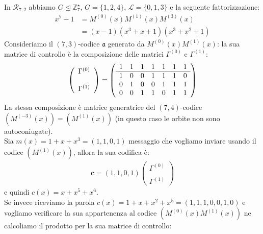 \begin{esempio} \label{ese:gamma72}
   In $\mathcal{R}_{7,2}$ abbiamo $G \trianglelefteq \mathbb{Z}_{7}^{\star}$, $G = \lbrace 1,2,4 \rbrace$, $\mathscr{L} = \lbrace 0,1,3 \rbrace$ e la seguente fattorizzazione:
   \begin{align*}
      x^{7} - 1 &= M^{(0)}(x) M^{(1)}(x) M^{(3)}(x) \\
		&= (x-1)(x^3 + x + 1)(x^3 + x^2 + 1)
  \end{align*}
  Consideriamo il $(7,3)$-codice $\mathfrak{a}$ generato da $M^{(0)}(x)M^{(1)}(x)$: la sua matrice di controllo è la composizione delle matrici $\Gamma^{(0)}$ e $\Gamma^{(1)}$:
  \begin{align*}
    \left(
    \begin{array} { c }
    \Gamma^{(0)}  \\ \\
    \Gamma^{(1)}
    \end{array}
    \right)
    =
    \left(
    \begin{array} { c c c c c c c c}
    1 & 1 & 1 & 1 & 1 & 1 & 1  \\
    \hline
    1 & 0 & 0 & 1 & 1 & 1 & 0  \\
    0 & 1 & 0 & 0 & 1 & 1 & 1  \\
    0 & 0 & 1 & 1 & 0 & 1 & 1  \\
    \end{array}
    \right)
  \end{align*}
  La stessa composizione è matrice generatrice del $(7,4)$-codice $(M^{(-3)}(x)) = (M^{(1)}(x))$ (in questo caso le orbite non sono autoconiugate).\\
  Sia $m(x) = 1 + x + x^3 = (1,1,0,1)$ messaggio che vogliamo inviare usando il codice $(M^{(1)}(x))$, allora la sua codifica è:
    \begin{align*}
    \mathbf{c}
    =
    (1,1,0,1)
    \left(
    \begin{array} { c }
    \Gamma^{(0)}  \\ \\
    \Gamma^{(1)}
    \end{array}
    \right)
  \end{align*}
  e quindi $c(x) = x+ x^5 + x^6$. \\
  Se invece riceviamo la parola $c(x) = 1 + x + x^2 + x^5 = (1,1,1,0,0,1,0)$ e vogliamo verificare la sua appartenenza al codice $(M^{(0)}(x)M^{(1)}(x))$ ne calcoliamo il prodotto per la sua matrice di controllo:
    \begin{align*}

\end{align*}
\end{esempio}
